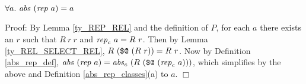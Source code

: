 \documentclass[envcountsame,runningheads]{llncs}
\begin{document}
\begin{theorem}
\label{ty_ABS_REP}
$\forall a.\ {\it abs}\ ({\it rep}\ a) = a$
\end{theorem}
Proof:
By Lemma \ref{ty_REP_REL}
 and the definition of $P$,
for each $a$
there exists an $r$ such that
$R\ r\ r$ and ${\it rep}_c\ a = R\ r$. 
Then
by Lemma \ref{ty_REL_SELECT_REL}, $R\ (\mbox{\tt \$@} \ (R\ r)) = R\ r$.
Now by Definition \ref{abs_rep_def}, ${\it abs}\ ({\it rep}\ a) =
{\it abs}_c\ (R\ (\mbox{\tt \$@}\ ({\it rep}_c\ a)))$,
which simplifies by the above and Definition \ref{abs_rep_classes}(a)
to $a$. $\Box$
\begin{comment}
$$
\begin{array}{rcl@{\hspace{2.0cm}}r}
{\it abs}\ ({\it rep}\ a)
& \ = \ &
{\it abs}_c\ (R\ (\mbox{\tt \$@}\ ({\it rep}_c\ a)))
& \mbox{Definition \ref{abs_rep_def}}  \\
& \ = \ &
{\it abs}_c\ (R\ (\mbox{\tt \$@}\ (R\ r)))
& \mbox{selection of $r$}  \\
& \ = \ &
{\it abs}_c\ (R\ r)
& \mbox{Lemma \ref{ty_REL_SELECT_REL} and $R\ r\ r$}  \\
& \ = \ &
{\it abs}_c\ ({\it rep}_c\ a)
\ = \ a
& \mbox{selection of $r$,} \ 
  \mbox{Definition \ref{abs_rep_classes}(a)}  \\
\Box \hfill & & &
\end{array}
$$
\end{comment}
\end{document}
